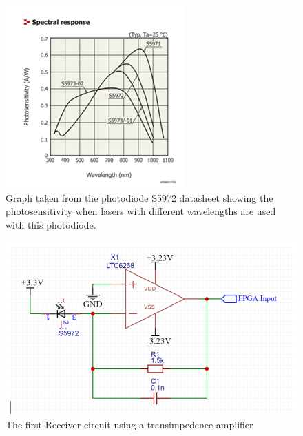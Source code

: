 \documentclass[conference]{IEEEtran}
\begin{document}
\begin{figure}[h!]
\includegraphics[width=\linewidth]{fig 5.png}\par
\caption{Graph taken from the photodiode S5972 datasheet showing the photosensitivity when lasers with different wavelengths are used with this photodiode.}
\label{fig}
\end{figure}

\begin{figure}[h!]
\includegraphics[width=\linewidth]{fig 6.png}\par
\caption{The first Receiver circuit using a transimpedence amplifier}
\label{fig}
\end{figure}
\end{document}
